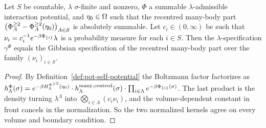 \begin{proposition}
    \label{prop:pot-self-absorption}
    \leanok

    Let $S$ be countable, $\lambda$ $\sigma$-finite and nonzero, $\Phi$ a summable
    $\lambda$-admissible interaction potential, and $\eta_0 \in \Omega$ such that the recentred
    many-body part $\bigl(\Phi^{\geq 2}_A - \Phi^{\geq 2}_A(\eta_0)\bigr)_{A \in \mathcal{S}}$ is
    absolutely summable. Let $c_i \in (0, \infty)$ be such that
    $\nu_i = c_i^{-1} e^{-\beta \Phi_{\left\{ i \right\}}}\lambda$ is a probability measure for each
    $i \in S$. Then the $\lambda$-specification $\gamma^\Phi$ equals the Gibbsian specification
    of the recentred many-body part over the family $(\nu_i)_{i \in S}$.
\end{proposition}
\begin{proof}
    \leanok

    By Definition~\ref{def:pot-self-potential} the Boltzmann factor factorizes as
    $h^\Phi_\Lambda(\sigma) = e^{-\beta H^{\Phi^{\geq 2}}_\Lambda(\eta_0)}\cdot
    h^{\mathrm{many, centred}}_\Lambda(\sigma) \cdot \prod_{i \in \Lambda}
    e^{-\beta \Phi_{\left\{ i \right\}}(\sigma)}$. The last product is the density turning
    $\lambda^\Lambda$ into $\bigotimes_{i \in \Lambda}(c_i \nu_i)$, and the volume-dependent
    constant in front cancels in the normalization. So the two normalized kernels agree on
    every volume and boundary condition.
\end{proof}
